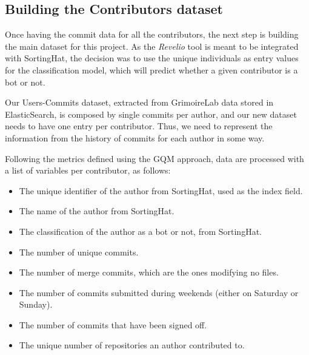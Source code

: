 \documentclass[a4paper, 12pt]{book}
\begin{document}
\subsection{Building the Contributors dataset}
\label{ssec:build-contributors-dataset}

Once having the commit data for all the contributors, the next step is building the main dataset for this project. As the \emph{Revelio} tool is meant to be integrated with SortingHat, the decision was to use the unique individuals as entry values for the classification model, which will predict whether a given contributor is a bot or not.

Our Users-Commits dataset, extracted from GrimoireLab data stored in ElasticSearch, is composed by single commits per author, and our new dataset needs to have one entry per contributor. Thus, we need to represent the information from the history of commits for each author in some way.

Following the metrics defined using the GQM approach, data are processed with a list of variables per contributor, as follows:

\begin{itemize}
\item The unique identifier of the author from SortingHat, used as the index field.
\item The name of the author from SortingHat.
\item The classification of the author as a bot or not, from SortingHat.
\item The number of unique commits.
\item The number of merge commits, which are the ones modifying no files.
\item The number of commits submitted during weekends (either on Saturday or Sunday).
\item The number of commits that have been signed off.
\item The unique number of repositories an author contributed to.
\end{itemize}
\end{document}
